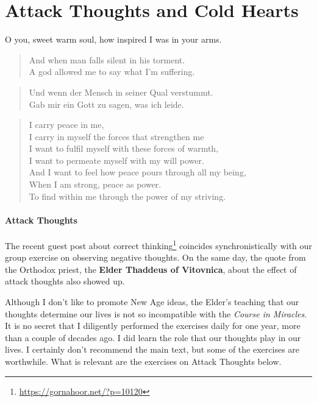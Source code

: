 \section{Attack Thoughts and Cold Hearts}

\begin{quotex}
O you, sweet warm soul, how inspired I was in your arms.

\begin{verse}
And when man falls silent in his torment.\\
A god allowed me to say what I'm suffering.
\end{verse}

\begin{verse}
Und wenn der Mensch in seiner Qual verstummt.\\
Gab mir ein Gott zu sagen, was ich leide.
\end{verse}

\begin{verse}
I carry peace in me,\\
I carry in myself the forces that strengthen me\\
I want to fulfil myself with these forces of warmth,\\
I want to permeate myself with my will power.\\
And I want to feel how peace pours through all my being,\\
When I am strong, peace as power.\\
To find within me through the power of my striving.
\end{verse}
\end{quotex}


\paragraph{Attack Thoughts}

The recent guest post about correct thinking\footnote{\url{https://gornahoor.net/?p=10120}} coincides synchronistically with our group exercise on observing negative thoughts. On the same day, the quote from the Orthodox priest, the \textbf{Elder Thaddeus of Vitovnica}, about the effect of attack thoughts also showed up.

Although I don't like to promote New Age ideas, the Elder's teaching that our thoughts determine our lives is not so incompatible with the \emph{Course in Miracles}. It is no secret that I diligently performed the exercises daily for one year, more than a couple of decades ago. I did learn the role that our thoughts play in our lives. I certainly don't recommend the main text, but some of the exercises are worthwhile. What is relevant are the exercises on Attack Thoughts below.

